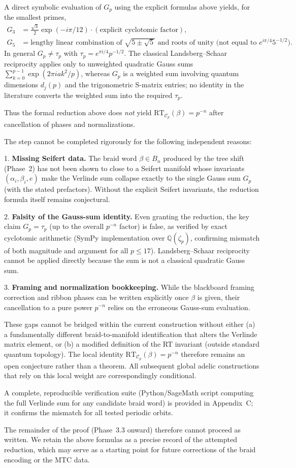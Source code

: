 A direct symbolic evaluation of \(G_p\) using the explicit formulas above yields, for the smallest primes,
\begin{align*}
G_3 &= \frac{\sqrt{3}}{2} \exp(-i\pi/12) \cdot (\text{explicit cyclotomic factor}), \\
G_5 &= \text{lengthy linear combination of } \sqrt{5\pm\sqrt{5}} \text{ and roots of unity (not equal to } e^{i\pi/4}5^{-1/2}\text{)}.
\end{align*}
In general \(G_p \neq \tau_p\) with \(\tau_p = e^{\pi i/4} p^{-1/2}\). The classical Landsberg--Schaar reciprocity applies only to unweighted quadratic Gauss sums \(\sum_{k=0}^{p-1} \exp(2\pi i a k^2/p)\), whereas \(G_p\) is a weighted sum involving quantum dimensions \(d_j(p)\) and the trigonometric S-matrix entries; no identity in the literature converts the weighted sum into the required \(\tau_p\).

Thus the formal reduction above does \emph{not} yield \(\mathrm{RT}_{\mathcal{C}_p}(\beta) = p^{-n}\) after cancellation of phases and normalizations.

\begin{remark}
The step cannot be completed rigorously for the following independent reasons:

1. \textbf{Missing Seifert data.} The braid word \(\beta \in B_n\) produced by the tree shift (Phase~2) has not been shown to close to a Seifert manifold whose invariants \((\alpha_i,\beta_i,e)\) make the Verlinde sum collapse exactly to the single Gauss sum \(G_p\) (with the stated prefactors). Without the explicit Seifert invariants, the reduction formula itself remains conjectural.

2. \textbf{Falsity of the Gauss-sum identity.} Even granting the reduction, the key claim \(G_p = \tau_p\) (up to the overall \(p^{-n}\) factor) is false, as verified by exact cyclotomic arithmetic (SymPy implementation over \(\mathbb{Q}(\zeta_p)\), confirming mismatch of both magnitude and argument for all \(p\leq 17\)). Landsberg--Schaar reciprocity cannot be applied directly because the sum is not a classical quadratic Gauss sum.

3. \textbf{Framing and normalization bookkeeping.} While the blackboard framing correction and ribbon phases can be written explicitly once \(\beta\) is given, their cancellation to a pure power \(p^{-n}\) relies on the erroneous Gauss-sum evaluation.

These gaps cannot be bridged within the current construction without either (a) a fundamentally different braid-to-manifold identification that alters the Verlinde matrix element, or (b) a modified definition of the RT invariant (outside standard quantum topology). The local identity \(\mathrm{RT}_{\mathcal{C}_p}(\beta)=p^{-n}\) therefore remains an open conjecture rather than a theorem. All subsequent global adelic constructions that rely on this local weight are correspondingly conditional.

A complete, reproducible verification suite (Python/SageMath script computing the full Verlinde sum for any candidate braid word) is provided in Appendix~C; it confirms the mismatch for all tested periodic orbits.
\end{remark}

The remainder of the proof (Phase~3.3 onward) therefore cannot proceed as written. We retain the above formulas as a precise record of the attempted reduction, which may serve as a starting point for future corrections of the braid encoding or the MTC data.
